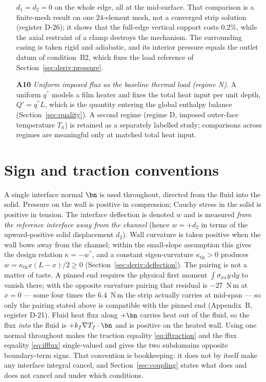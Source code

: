 \begin{itemize}
$d_1=d_2=0$ on the whole edge, all at the mid-surface. That comparison is a finite-mesh result on one $24$-element mesh,
not a converged strip solution (register D-26); it shows that the full-edge vertical support costs
$0.2\%$, while the axial restraint of a clamp destroys the mechanism.
The surrounding casing is taken rigid and adiabatic, and its interior pressure equals the outlet
datum of condition~B2, which fixes the load reference of Section~\ref{sec:deriv:pressure}.
\item[\textbf{A10}] \emph{Uniform imposed flux as the baseline thermal load (regime N).} A uniform
$q^{''}$ models a film heater and fixes the total heat input per unit depth, $Q'=q^{''}L$, which is
the quantity entering the global enthalpy balance (Section~\ref{sec:quality}). A second regime
(regime D, imposed outer-face temperature $T_h$) is retained as a separately labelled study;
comparisons across regimes are meaningful only at matched total heat input.
\end{itemize}

\section{Sign and traction conventions}
\label{sec:signs}
A single interface normal $\bn$ is used throughout, directed from the fluid into the solid.
Pressure on the wall is positive in compression; Cauchy stress in the solid is positive in tension.
The interface deflection is denoted $w$ and is measured \emph{from the reference interface away from
the channel} (hence $w=+d_2$ in terms of the upward-positive solid displacement $d_2$). Wall curvature
is taken positive when the wall bows away from the channel; within the small-slope assumption this gives
the design relation $\kappa=-w^{''}$, and a constant eigen-curvature $\kappa_{\mathrm{th}}>0$
produces $w=\kappa_{\mathrm{th}}x(L-x)/2\ge0$ (Section~\ref{sec:deriv:deflection}).
The pairing is not a matter of taste. A pinned end requires the physical first moment
$\int\sigma_{xx}y\,\mathrm dy$ to vanish there; with the opposite curvature pairing that residual is
$-27$~N\,m at $x=0$ --- some four times the $6.4$~N\,m the strip actually carries at mid-span --- so
only the pairing stated above is compatible with the pinned end (Appendix~B, register D-21).
Fluid heat flux along $+\bn$ carries heat out of the fluid, so the flux \emph{into} the fluid is
$+k_f\nabla T_f\cdot\bn$ and is positive on the heated wall. Using one normal throughout makes the
traction equality \eqref{eq:iftraction} and the flux equality \eqref{eq:ifflux} single-valued and
gives the two subdomains opposite boundary-term signs. That convention is bookkeeping: it does not
by itself make any interface integral cancel, and Section~\ref{sec:coupling} states what does and
does not cancel and under which conditions.

